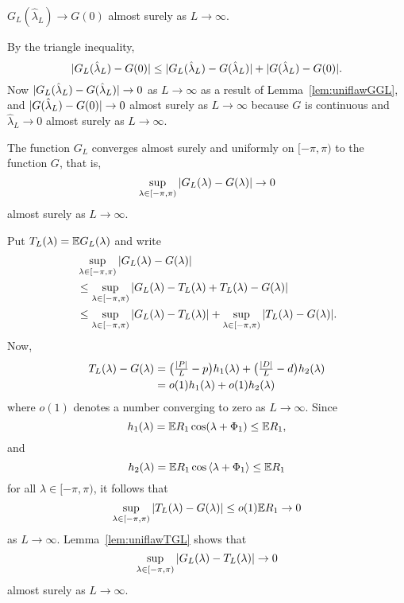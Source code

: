 \documentclass[journal]{IEEEtran}
\begin{document}

\begin{lemma}\label{lem:GLtoG0}
$G_L(\hat{\lambda}_L) \rightarrow G(0)$ almost surely as $L \rightarrow \infty$.
\end{lemma}
\begin{IEEEproof}
By the triangle inequality,
\[
{\vert G_L(\hat{\lambda}_L) - G(0) \vert} \leq {\vert G_L(\hat{\lambda}_L) - G(\hat{\lambda}_L) \vert} + {\vert G(\hat{\lambda}_L) - G(0) \vert}.
\]
Now ${\vert G_L(\hat{\lambda}_L) - G(\hat{\lambda}_L) \vert} \rightarrow 0$ as $L \rightarrow \infty$ as a result of Lemma~\ref{lem:uniflawGGL}, and ${\vert G(\hat{\lambda}_L) - G(0) \vert} \rightarrow 0$ almost surely as $L \rightarrow \infty$ because $G$ is continuous and $\hat{\lambda}_L \rightarrow 0$ almost surely as $L \rightarrow \infty$.
\end{IEEEproof}
 

\begin{lemma}\label{lem:uniflawGGL}
The function $G_L$ converges almost surely and uniformly on $[-\pi, \pi)$ to the function $G$, that is,
\[
\sup_{\lambda \in [-\pi, \pi)}{\vert G_L(\lambda) - G(\lambda) \vert} \rightarrow 0
\] 
almost surely as $L \rightarrow \infty$.
\end{lemma}
\begin{IEEEproof}
Put $T_L(\lambda) = {\mathbb E} G_L(\lambda)$ and write
\begin{align*}
&\sup_{\lambda \in [-\pi, \pi)}{\vert G_L(\lambda) - G(\lambda) \vert} \\
&\leq \sup_{\lambda \in [-\pi, \pi)}{\vert G_L(\lambda) - T_L(\lambda) + T_L(\lambda) - G(\lambda) \vert} \\
&\leq \sup_{\lambda \in [-\pi, \pi)}{\vert G_L(\lambda) - T_L(\lambda) \vert} +  \sup_{\lambda \in [-\pi, \pi)}{\vert T_L(\lambda) - G(\lambda) \vert}.
\end{align*}
Now,
\begin{align*}
T_L(\lambda) - G(\lambda) &= \big(\tfrac{{\left\vert P \right\vert}}{L} - p\big)h_1(\lambda) + \big(\tfrac{{\left\vert D \right\vert}}{L} - d\big)h_2(\lambda) \\
&= o(1) h_1(\lambda) + o(1) h_2(\lambda)
\end{align*}
where $o(1)$ denotes a number converging to zero as $L \rightarrow \infty$.  Since 
\[
h_1(\lambda) = {\mathbb E} R_1\cos(\lambda + \Phi_1) \leq {\mathbb E} R_1,
\]
and 
\[
h_2(\lambda) = {\mathbb E} R_1\cos\left\langle \lambda + \Phi_1 \right\rangle \leq {\mathbb E} R_1
\] 
for all $\lambda \in [-\pi, \pi)$, it follows that 
\[
\sup_{\lambda \in [-\pi, \pi)}{\vert T_L(\lambda) - G(\lambda) \vert} \leq o(1) {\mathbb E} R_1 \rightarrow 0
\]  
as $L\rightarrow \infty$.  Lemma~\ref{lem:uniflawTGL} shows that 
\[
\sup_{\lambda \in [-\pi, \pi)}{\vert G_L(\lambda) - T_L(\lambda) \vert} \rightarrow 0
\]
almost surely as $L\rightarrow \infty$.
\end{IEEEproof}
\end{document}
